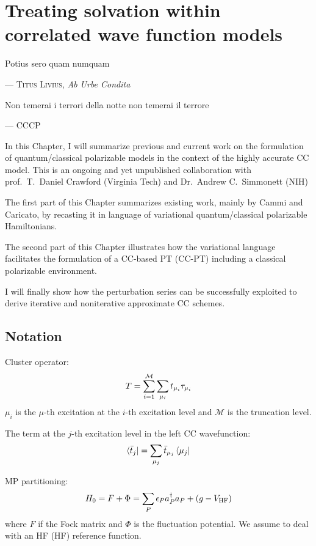 \chapter{Treating solvation within correlated wave function models}\label{ch:PCMCC}

\epigraph{Potius sero quam numquam}{--- \textsc{Titus Livius}, \textit{Ab Urbe Condita}}

\epigraph{Non temerai i terrori della notte non temerai il terrore}{--- \textsc{CCCP}}

In this Chapter, I will summarize previous and current work on the
formulation of quantum/classical polarizable models in the context of
the highly accurate \acl{CC} model.
This is an ongoing and yet unpublished collaboration with prof.~T.~Daniel Crawford
(Virginia Tech) and Dr.~Andrew C.~Simmonett (NIH)

The first part of this Chapter summarizes existing work, mainly by Cammi
and Caricato, by recasting it in language of variational
quantum/classical polarizable Hamiltonians.

The second part of this Chapter illustrates how the variational language
facilitates the formulation of a \acl{CC}-based \acl{PT} (\acs{CC}-\acs{PT})
including a classical polarizable environment.

I will finally show how the perturbation series can be successfully
exploited to derive iterative and noniterative approximate \acs{CC}
schemes.

\pagebreak

\section{Notation}
Cluster operator:
\begin{equation}
  T = \sum_{i=1}^\mathcal{M}\sum_{\mu_i}t_{\mu_i}\tau_{\mu_i}
\end{equation}
$\mu_i$ is the $\mu$-th excitation at the $i$-th
excitation level and $\mathcal{M}$ is the truncation level.

The term at the $j$-th excitation level in the left CC wavefunction:
\begin{equation}
  \bra{\bar{t}_{j}} = \sum_{\mu_j}\bar{t}_{\mu_j}\bra{\mu_j}
\end{equation}

\acl{MP} partitioning:
\begin{equation}
 H_0 = F + \Phi = \sum_P\epsilon_Pa_{P}^{\dagger}a_{P} + (g- V_\mathrm{HF})
\end{equation}
where $F$ if the Fock matrix and $\Phi$ is the fluctuation potential.
We assume to deal with an \acl{HF} (\acs{HF}) reference function.

